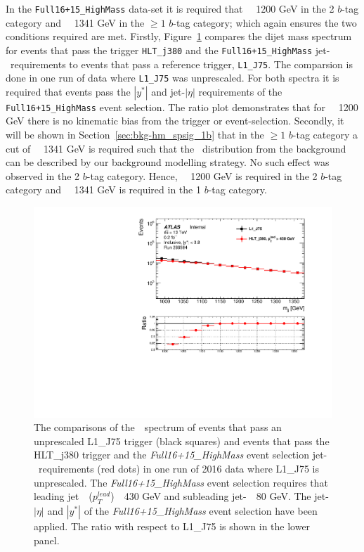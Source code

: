 In the \verb|Full16+15_HighMass| data-set it is required that \mjj~\gt~1200 GeV in the 2 $b$-tag category and
\mjj~\gt~1341 GeV in the $\geq1$ $b$-tag category;
which again ensures the two conditions required are met.
Firstly, Figure~\ref{fig:evt-hm_turnon} compares the dijet mass spectrum
for events that pass the trigger \verb|HLT_j380| and the \verb|Full16+15_HighMass| jet-\pT~requirements
to events that pass a reference trigger, \verb|L1_J75|.
The comparsion is done in one run of data where \verb|L1_J75| was unprescaled.
For both spectra it is required that events pass the $|y^*|$ and jet-$|\eta|$ requirements of the \verb|Full16+15_HighMass| event selection.
The ratio plot demonstrates that for \mjj~\gt~1200 GeV there is no kinematic bias from the trigger or event-selection.
Secondly, it will be shown in Section~\ref{sec:bkg-hm_spsig_1b}
that in the $\geq1$ $b$-tag category a cut of \mjj~\gt~1341 GeV is required such that the
\mjj~distribution from the background can be described by our background modelling strategy.
No such effect was observed in the 2 $b$-tag category.
Hence, \mjj~\gt~1200 GeV is required in the 2 $b$-tag category and
\mjj~\gt~1341 GeV is required in the 1 $b$-tag category.


\begin{figure}[!ht]
  \begin{center}
    \includegraphics[width=0.6\linewidth, angle=0]{figs/Dibjet/HighMass/evt-mjj.pdf}
  \end{center}
  \caption{The comparisons of the~\mjj~spectrum of events that pass an unprescaled L1\_J75 trigger (black squares)
    and events that pass the  HLT\_j380 trigger and the \textit{Full16+15\_HighMass} event selection jet-\pT~requirements (red dots)
    in one run of 2016 data where L1\_J75 is unprescaled.
    The \textit{Full16+15\_HighMass} event selection requires that leading jet~\pT~($p_T^{lead}$)~\gt~430 GeV and subleading jet-\pT~\gt~80 GeV.
    The jet-$|\eta|$ and $|y^*|$ of the \textit{Full16+15\_HighMass} event selection have been applied.
    The ratio with respect to L1\_J75 is shown in the lower panel.}
     \label{fig:evt-hm_turnon}
\end{figure}

